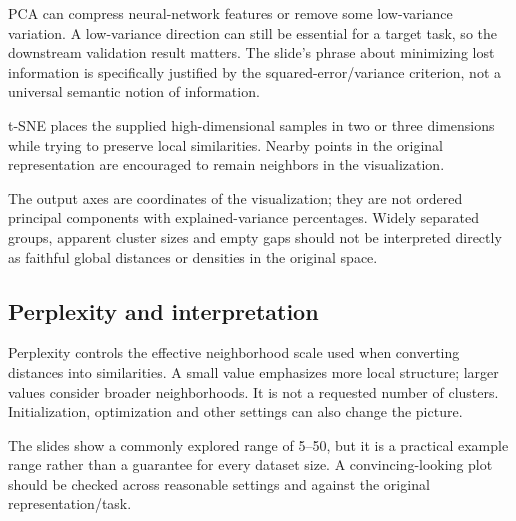 \documentclass[11pt]{article}
\begin{document}
PCA can compress neural-network features or remove some low-variance variation. A low-variance direction can still be essential for a target task, so the downstream validation result matters. The slide's phrase about minimizing lost information is specifically justified by the squared-error/variance criterion, not a universal semantic notion of information.

t-SNE places the supplied high-dimensional samples in two or three dimensions while trying to preserve local similarities. Nearby points in the original representation are encouraged to remain neighbors in the visualization.

The output axes are coordinates of the visualization; they are not ordered principal components with explained-variance percentages. Widely separated groups, apparent cluster sizes and empty gaps should not be interpreted directly as faithful global distances or densities in the original space.

\subsection{Perplexity and interpretation}
Perplexity controls the effective neighborhood scale used when converting distances into similarities. A small value emphasizes more local structure; larger values consider broader neighborhoods. It is not a requested number of clusters. Initialization, optimization and other settings can also change the picture.

The slides show a commonly explored range of 5--50, but it is a practical example range rather than a guarantee for every dataset size. A convincing-looking plot should be checked across reasonable settings and against the original representation/task.
\end{document}
